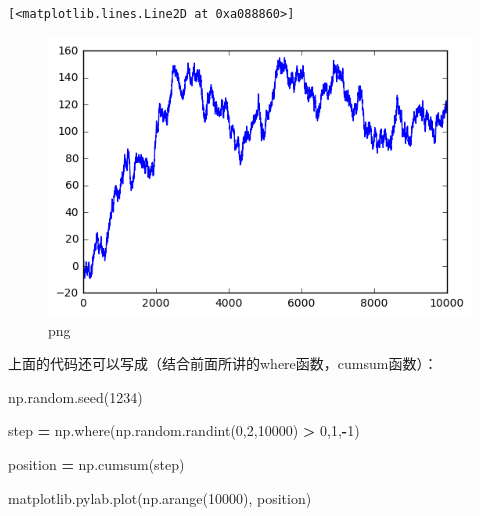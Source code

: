 \documentclass[]{article}
\newenvironment{Shaded}{\begin{snugshade}}{\end{snugshade}}
\newcommand{\DecValTok}[1]{\textcolor[rgb]{0.00,0.00,0.81}{#1}}
\newcommand{\OperatorTok}[1]{\textcolor[rgb]{0.81,0.36,0.00}{\textbf{#1}}}
\newcommand{\NormalTok}[1]{#1}
\begin{document}
\begin{verbatim}
[<matplotlib.lines.Line2D at 0xa088860>]
\end{verbatim}

\begin{figure}
\centering
\includegraphics{output_215_1.png}
\caption{png}
\end{figure}

上面的代码还可以写成（结合前面所讲的where函数，cumsum函数）：

\begin{Shaded}
\begin{Highlighting}[]
\NormalTok{np.random.seed(}\DecValTok{1234}\NormalTok{)}
\end{Highlighting}
\end{Shaded}

\begin{Shaded}
\begin{Highlighting}[]
\NormalTok{step }\OperatorTok{=}\NormalTok{ np.where(np.random.randint(}\DecValTok{0}\NormalTok{,}\DecValTok{2}\NormalTok{,}\DecValTok{10000}\NormalTok{) }\OperatorTok{>} \DecValTok{0}\NormalTok{,}\DecValTok{1}\NormalTok{,}\OperatorTok{-}\DecValTok{1}\NormalTok{)}
\end{Highlighting}
\end{Shaded}

\begin{Shaded}
\begin{Highlighting}[]
\NormalTok{position }\OperatorTok{=}\NormalTok{ np.cumsum(step)}
\end{Highlighting}
\end{Shaded}

\begin{Shaded}
\begin{Highlighting}[]
\NormalTok{matplotlib.pylab.plot(np.arange(}\DecValTok{10000}\NormalTok{), position)}
\end{Highlighting}
\end{Shaded}
\end{document}
